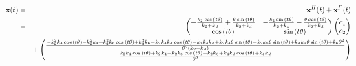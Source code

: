 \documentclass[11pt]{article}
\begin{document}
    \begin{eqnarray*}
{\bf x} (t) & = & {\bf x}^H (t) + {\bf x}^P (t) \\
& = & \begin{pmatrix}- \frac{k_{2} \cos{\left(t \theta \right)}}{k_{2} + k_{d}} + \frac{\theta \sin{\left(t \theta \right)}}{k_{2} + k_{d}} & - \frac{k_{2} \sin{\left(t \theta \right)}}{k_{2} + k_{d}} - \frac{\theta \cos{\left(t \theta \right)}}{k_{2} + k_{d}}\\\cos{\left(t \theta \right)} & \sin{\left(t \theta \right)}\end{pmatrix}  \begin{pmatrix} c_1 \\ c_2 \end{pmatrix} \\
&  & + \begin{pmatrix}\frac{- k_{2}^{2} k_{4} \cos{\left(t \theta \right)} - k_{2}^{2} k_{4} + k_{2}^{2} k_{6} \cos{\left(t \theta \right)} + k_{2}^{2} k_{6} - k_{2} k_{4} k_{d} \cos{\left(t \theta \right)} - k_{2} k_{4} k_{d} + k_{2} k_{4} \theta \sin{\left(t \theta \right)} - k_{2} k_{6} \theta \sin{\left(t \theta \right)} + k_{4} k_{d} \theta \sin{\left(t \theta \right)} + k_{6} \theta^{2}}{\theta^{2} \left(k_{2} + k_{d}\right)}\\\frac{k_{2} k_{4} \cos{\left(t \theta \right)} + k_{2} k_{4} - k_{2} k_{6} \cos{\left(t \theta \right)} - k_{2} k_{6} + k_{4} k_{d} \cos{\left(t \theta \right)} + k_{4} k_{d}}{\theta^{2}}\end{pmatrix}
\end{eqnarray*}
\end{document}
